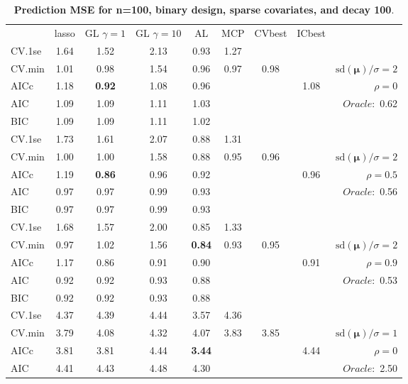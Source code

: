 \clearpage
\begin{table}\vspace{-.5cm}
\caption[l]{ { \bf Prediction MSE for n=100, binary design, 
sparse covariates, and  decay  100}.}
\vspace{-.5cm}
\footnotesize{}
\begin{center}
\begin{tabular}{l*{7}{c}|r}
 & lasso & GL $\gamma=1$ & GL $\gamma=10$ & AL & MCP  & CVbest & ICbest  \\
\cline{1-9}
CV.1se & 1.64 & 1.52 & 2.13 & 0.93 & 1.27 & & & \\
CV.min & 1.01 & 0.98 & 1.54 & 0.96 & 0.97 & 0.98 & & $\mathrm{sd}(\mathbf{\mu})/\sigma=2$ \\
AICc & 1.18 & {\bf 0.92} & 1.08 & 0.96 & & & 1.08 &  $\rho=0$ \\
AIC & 1.09 & 1.09 & 1.11 & 1.03 & & & &  \multirow{2}{*}{$Oracle: $ 0.62} \\
BIC & 1.09 & 1.09 & 1.11 & 1.02 & & & &  \\
 \hline 
CV.1se & 1.73 & 1.61 & 2.07 & 0.88 & 1.31 & & & \\
CV.min & 1.00 & 1.00 & 1.58 & 0.88 & 0.95 & 0.96 & & $\mathrm{sd}(\mathbf{\mu})/\sigma=2$ \\
AICc & 1.19 & {\bf 0.86} & 0.96 & 0.92 & & & 0.96 &  $\rho=0.5$ \\
AIC & 0.97 & 0.97 & 0.99 & 0.93 & & & &  \multirow{2}{*}{$Oracle: $ 0.56} \\
BIC & 0.97 & 0.97 & 0.99 & 0.93 & & & &  \\
 \hline 
CV.1se & 1.68 & 1.57 & 2.00 & 0.85 & 1.33 & & & \\
CV.min & 0.97 & 1.02 & 1.56 & {\bf 0.84} & 0.93 & 0.95 & & $\mathrm{sd}(\mathbf{\mu})/\sigma=2$ \\
AICc & 1.17 & 0.86 & 0.91 & 0.90 & & & 0.91 &  $\rho=0.9$ \\
AIC & 0.92 & 0.92 & 0.93 & 0.88 & & & &  \multirow{2}{*}{$Oracle: $ 0.53} \\
BIC & 0.92 & 0.92 & 0.93 & 0.88 & & & &  \\
 \hline 
CV.1se & 4.37 & 4.39 & 4.44 & 3.57 & 4.36 & & & \\
CV.min & 3.79 & 4.08 & 4.32 & 4.07 & 3.83 & 3.85 & & $\mathrm{sd}(\mathbf{\mu})/\sigma=1$ \\
AICc & 3.81 & 3.81 & 4.44 & {\bf 3.44} & & & 4.44 &  $\rho=0$ \\
AIC & 4.41 & 4.43 & 4.48 & 4.30 & & & &  \multirow{2}{*}{$Oracle: $ 2.50} \\

\end{tabular}
\end{center}
\end{table}
